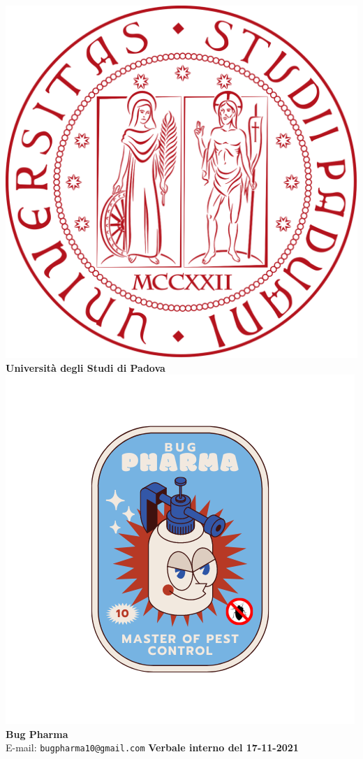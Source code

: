 \documentclass[11pt]{article}
\begin{document}
	\thispagestyle{empty}
	\begin{titlepage}
		\begin{center}
			\includegraphics[scale = 0.05]{../../Res/logo_unipd.png}\\
			\bigskip
			\large \textbf{Università degli Studi di Padova} \\
			\vfill
			\includegraphics[scale = 0.7]{../../Res/BugPharma_Logo.png}\\
			\large \textbf{Bug Pharma} \\
			\vfill
			\large
			E-mail: 
			\texttt{bugpharma10@gmail.com}
			\vfill
			\Huge \textbf{Verbale interno del 17-11-2021}\\
			

\end{center}
\end{titlepage}
\end{document}

